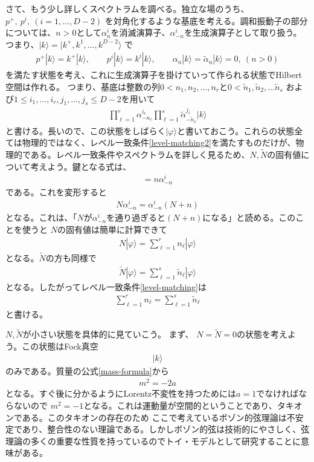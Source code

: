 \documentclass[report,paper=a4, fontsize=12pt, line_length=16cm, number_of_lines=33,dvipdfmx]{jlreq}
\numberwithin{equation}{chapter}
\numberwithin{equation}{section}
\newcommand{\alphat}{\tilde{\alpha}}
\newcommand{\Nt}{\widetilde{N}}
\begin{document}
さて、もう少し詳しくスペクトラムを調べる。独立な場のうち、$p^{+},\ p^{i},\ (i=1,\dots, D-2)$
を対角化するような基底を考える。調和振動子の部分については、$n>0$として$\alpha_n^i$を消滅演算子、$\alpha_{-n}^i$を生成演算子として取り扱う。つまり、$|k\rangle=|k^+,k^1,\dots,k^{D-2}\rangle$ で
\begin{align}
p^{+}|k\rangle=k^{+}|k\rangle,\qquad
p^{i}|k\rangle=k^{i}|k\rangle,\qquad
\alpha_n|k\rangle=\alphat_n|k\rangle=0,\ (n>0)
\end{align}
を満たす状態を考え、これに生成演算子を掛けていって作られる状態でHilbert空間は作れる。
つまり、基底は整数の列$0<n_1,n_2, \dots, n_{r}$と$0<\tilde n_1, \tilde n_2, \dots \tilde n_{s}$
および$1 \le i_1,\dots,i_r,j_1,\dots,j_s\le D-2$を用いて
\begin{align}
\prod_{\ell=1}^{r}\alpha_{-n_{\ell}}^{i_{\ell}} \prod_{\ell=1}^{s}\alphat_{-\tilde n_{\ell}}^{j_{\ell}}|k\rangle
\end{align}
と書ける。長いので、この状態をしばらく$|\varphi\rangle$と書いておこう。これらの状態全ては物理的ではなく、レベル一致条件\eqref{level-matching2}を満たすものだけが、物理的である。レベル一致条件やスペクトラムを詳しく見るため、$N,\Nt$の固有値について考えよう。鍵となる式は、
\begin{align}
[N,\alpha^i_{-n}]=n\alpha^i_{-n}
\end{align}
である。これを変形すると
\begin{align}
N\alpha^i_{-n}=\alpha^i_{-n}(N+n)
\end{align}
となる。これは、「$N$が$\alpha^i_{-n}$を通り過ぎると$(N+n)$になる」と読める。このことを使うと
$N$の固有値は簡単に計算できて
\begin{align}
N|\varphi\rangle=\sum_{\ell=1}^{r}n_{\ell}|\varphi\rangle
\end{align}
となる。$\Nt$の方も同様で
\begin{align}
\Nt|\varphi\rangle=\sum_{\ell=1}^{s}\tilde n_{\ell}|\varphi\rangle
\end{align}
となる。したがってレベル一致条件\eqref{level-matching}は
\begin{align}
\sum_{\ell=1}^{r}n_{\ell}=\sum_{\ell=1}^{s}\tilde n_{\ell}
\end{align}
と書ける。

$N,\Nt$が小さい状態を具体的に見ていこう。
まず、 $N=\Nt=0$の状態を考えよう。この状態はFock真空
\begin{align}
 |k\rangle
\end{align}
のみである。質量の公式\eqref{mass-formula}から
\begin{align}
m^2=-2a
\end{align}
となる。すぐ後に分かるようにLorentz不変性を持つためには$a=1$でなければならないので
$m^2=-1$となる。これは運動量が空間的ということであり、タキオンである。このタキオンの存在のため
ここで考えているボゾン的弦理論は不安定であり、整合性のない理論である。しかしボゾン的弦は技術的にやさしく、弦理論の多くの重要な性質を持っているのでトイ・モデルとして研究することに意味がある。
\end{document}
